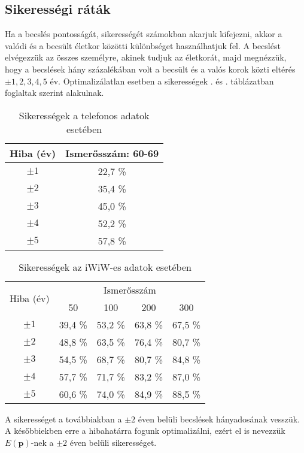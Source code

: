 \documentclass[12pt]{article}
\begin{document}
\subsection{Sikerességi ráták}
Ha a becslés pontosságát, sikerességét számokban akarjuk kifejezni, akkor a valódi és a becsült életkor közötti különbséget használhatjuk fel. A becslést elvégezzük az összes személyre, akinek tudjuk az életkorát, majd megnézzük, hogy a becslések hány százalékában volt a becsült és a valós korok közti eltérés $\pm 1, 2,3,4,5$ év. Optimalizálatlan esetben a sikerességek . és . táblázatban foglaltak szerint alakulnak.
\begin{table}[H]
	\centering
	\begin{tabular}{|c|c|}
		\hline
		Hiba (év) & Ismerősszám: 60-69 \\
		\hline
		$\pm 1$ & 22,7 \% \\
		\hline
		$\pm 2$ & 35,4 \% \\
		\hline
		$\pm 3$ & 45,0 \% \\
		\hline
		$\pm 4$ & 52,2 \% \\
		\hline
		$\pm 5$ & 57,8 \% \\
		\hline
	\end{tabular}
	\caption{Sikerességek a telefonos adatok esetében}
	\label{telefon_sikeresseg_nemopt}
\end{table}
\begin{table}[H]
	\centering
	\begin{tabular}{|c|c|c|c|c|}
		\hline
		\multirow{2}{*}{Hiba (év)} & \multicolumn{4}{|c|}{Ismerősszám} \\ \cline{2-5} & 50 & 100 & 200 & 300 \\
		\hline
		$\pm 1$ & 39,4 \% & 53,2 \% & 63,8 \% & 67,5 \% \\
		\hline
		$\pm 2$ & 48,8 \% & 63,5 \% & 76,4 \% & 80,7 \% \\
		\hline
		$\pm 3$ & 54,5 \% & 68,7 \% & 80,7 \% & 84,8 \% \\
		\hline
		$\pm 4$ & 57,7 \% & 71,7 \% & 83,2 \% & 87,0 \% \\
		\hline
		$\pm 5$ & 60,6 \% & 74,0 \% & 84,9 \% & 88,5 \% \\
		\hline
	\end{tabular}
	\caption{Sikerességek az iWiW-es adatok esetében}
	\label{iwiw_sikeresseg_nemopt} %
\end{table}
A sikerességet a továbbiakban a $\pm 2$ éven belüli becslések hányadosának vesszük. A későbbiekben erre a hibahatárra fogunk optimalizálni, ezért el is nevezzük $E(\mathbf{p})$-nek a $\pm 2$ éven belüli sikerességet.
\end{document}
